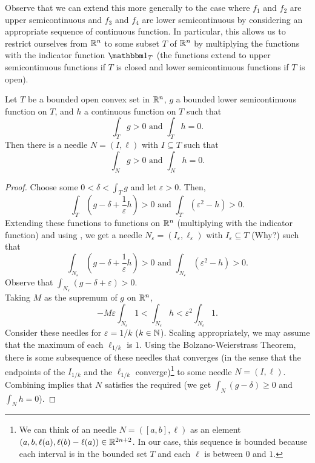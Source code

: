 Observe that we can extend this more generally to the case where $f_1$ and $f_2$ are upper semicontinuous and $f_3$ and $f_4$ are lower semicontinuous by considering an appropriate sequence of continuous function. In particular, this allows us to restrict ourselves from $\mathbb{R}^n$ to some subset $T$ of $\mathbb{R}^n$ by multiplying the functions with the indicator function $\indic_T$ (the functions extend to upper semicontinuous functions if $T$ is closed and lower semicontinuous functions if $T$ is open).

\begin{corollary}
	\label{cor: if positive on convex set convex on some needle}
	Let $T$ be a bounded open convex set in $\mathbb{R}^n$, $g$ a bounded lower semicontinuous function on $T$, and $h$ a continuous function on $T$ such that
	\[ \int_T g > 0 \text{ and } \int_T h = 0. \]
	Then there is a needle $N=(I,\ell)$ with $I\subseteq T$ such that
	\[ \int_N g > 0 \text{ and } \int_N h = 0. \]
\end{corollary}
\begin{proof}
	Choose some $0<\delta<\int_T g$ and let $\varepsilon>0$. Then,
	\[ \int_T \left(g-\delta+\frac{1}{\varepsilon}h\right) > 0 \text{ and } \int_T (\varepsilon^2	-h) > 0. \]
	Extending these functions to functions on $\mathbb{R}^n$ (multiplying with the indicator function) and using , we get a needle $N_\varepsilon=(I_\varepsilon,\ell_\varepsilon)$ with $I_\varepsilon\subseteq T$ (Why?) such that
	\begin{equation}
		\label{eqn: 5.1}
		\int_{N_\varepsilon} \left(g-\delta+\frac{1}{\varepsilon}h\right) > 0 \text{ and } \int_{N_\varepsilon} (\varepsilon^2-h) > 0.
	\end{equation}
	Observe that $\int_{N_\varepsilon} (g-\delta+\varepsilon)>0$.\\
	Taking $M$ as the supremum of $g$ on $\mathbb{R}^n$,
	\begin{equation}
		\label{eqn: 5.2}
		-M\varepsilon\int_{N_\varepsilon} 1 < \int_{N_\varepsilon} h < \varepsilon^2 \int_{N_\varepsilon} 1.
	\end{equation}
	Consider these needles for $\varepsilon=1/k$ ($k\in\mathbb{N}$). Scaling appropriately, we may assume that the maximum of each $\ell_{1/k}$ is $1$. Using the Bolzano-Weierstrass Theorem, there is some subsequence of these needles that converges (in the sense that the endpoints of the $I_{1/k}$ and the $\ell_{1/k}$ converge)\footnote{We can think of an needle $N=([a,b],\ell)$ as an element $(a,b,\ell(a),\ell(b)-\ell(a))\in\mathbb{R}^{2n+2}$. In our case, this sequence is bounded because each interval is in the bounded set $T$ and each $\ell$ is between $0$ and $1$.} to some needle $N=(I,\ell)$. Combining  implies that $N$ satisfies the required (we get $\int_N (g-\delta) \geq 0$ and $\int_N h = 0$).
\end{proof}

